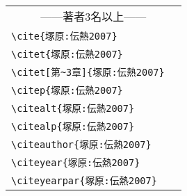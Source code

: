 \begin{table}[t]
\begin{tabular}{ll}
        \multicolumn{2}{c}{------著者3名以上------} \\
        \verb|\cite{塚原:伝熱2007}|             &\cite{塚原:伝熱2007} \\
        \verb|\citet{塚原:伝熱2007}|            &\citet{塚原:伝熱2007} \\
        \verb|\citet[第~3章]{塚原:伝熱2007}|            &\citet[第~3章]{塚原:伝熱2007} \\
        \verb|\citep{塚原:伝熱2007}|            &\citep{塚原:伝熱2007} \\
        \verb|\citealt{塚原:伝熱2007}|          &\citealt{塚原:伝熱2007} \\
        \verb|\citealp{塚原:伝熱2007}|          &\citealp{塚原:伝熱2007} \\
        \verb|\citeauthor{塚原:伝熱2007}|       &\citeauthor{塚原:伝熱2007} \\
        \verb|\citeyear{塚原:伝熱2007}|         &\citeyear{塚原:伝熱2007} \\
        \verb|\citeyearpar{塚原:伝熱2007}|      &\citeyearpar{塚原:伝熱2007}
    \end{tabular}
\end{table}

